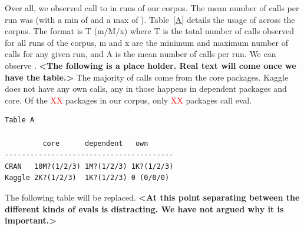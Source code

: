 \documentclass[conference]{IEEEtran}
\newcommand{\missingNumber}{\textcolor{red}{XX}\xspace}
\begin{document}
Over all, we observed \AllAllCallCountRnd call to \eval in  runs
of our corpus. The mean number of calls per run was  (with a min of
 and a max of ). Table~\ref{A} details the usage of
\eval across the corpus.  The format is T (m/M/x) where T is the total
number of calls observed for all runs of the corpus, m and x are the minimum
and maximum number of calls for any given run, and A is the mean number of
calls per run.  We can observe . {\bf <The following is a place
  holder. Real text will come once we have the table.>} The majority of
calls come from the core packages.  Kaggle does not have any own calls, any
\eval in those happens in dependent packages and core.  Of the
\missingNumber packages in our corpus, only \missingNumber packages call
eval.


\begin{verbatim}
Table A

         core      dependent   own
----------------------------------------
CRAN   10M?(1/2/3) 1M?(1/2/3) 1K?(1/2/3)
Kaggle 2K?(1/2/3)  1K?(1/2/3) 0 (0/0/0)
\end{verbatim}

\begin{table}[ht]
  \label{table:source-eval-summary}
  \caption{Distribution of eval calls in CRAN and Kaggle}
\end{table}



The following table will be replaced. {\bf <At this point separating between
  the different kinds of evals is distracting. We have not argued why it is
  important.>}
\end{document}

